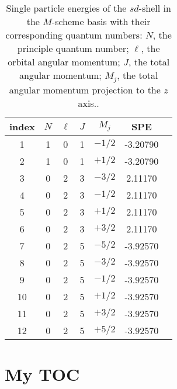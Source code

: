 \documentclass[aps,prl,reprint,groupedaddress]{revtex4-1}  %
\begin{document}
\begin{table}[h]
\caption{Single particle energies of the $sd$-shell in the $M$-scheme basis with their corresponding quantum numbers: $N$, the principle quantum number; $\ell$, the orbital angular momentum; $J$, the total angular momentum; $M_j$, the total angular momentum projection to the $z$ axis.. \label{tab:SPE}}
\begin{ruledtabular}
\begin{tabular}{c|cccccc}
index	&	$N$	&	$\ell$	&	$J$	&	$M_j$	&	SPE			\\
\hline 
1		&	1	&	0		&	1	&	$-1/2$	&	-3.20790	\\
2		&	1	&	0		&	1	&	$+1/2$	&	-3.20790	\\
3		& 	0	&	2		&	3	&	$-3/2$	&	 2.11170	\\
4		&	0	&	2		&	3	&	$-1/2$	&	 2.11170	\\
5		&	0	&	2		&	3	&	$+1/2$	&	 2.11170	\\
6		&	0	&	2		&	3	&	$+3/2$	&	 2.11170	\\
7		&	0	&	2		&	5	&	$-5/2$	&	-3.92570	\\
8		&	0	&	2		&	5	&	$-3/2$	&	-3.92570	\\
9		&	0	&	2		&	5	&	$-1/2$	&	-3.92570	\\
10		&	0	&	2		&	5	&	$+1/2$	&	-3.92570	\\
11		&	0	&	2		&	5	&	$+3/2$	&	-3.92570	\\
12		&	0	&	2		&	5	&	$+5/2$	&	-3.92570	
\end{tabular}
\end{ruledtabular}
\end{table}

\appendix

\section{My TOC}
\end{document}
